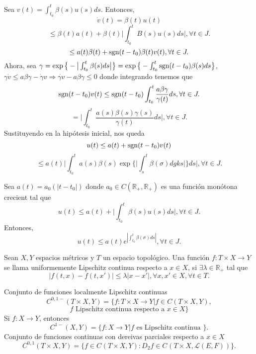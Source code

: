 \begin{dem}
  Sea $v(t) = \int_{t_{0}}^{t} \beta(s) u(s) ds$. Entonces,
  \[ 
    \dot{v}(t) = \beta(t) u(t) 
  \] 
  \[ 
    \leq \beta(t) a(t) + \beta(t) \Big | \int_{t_{0}}^{t} B(s) u(s)  ds \Big |, \forall t \in J.
  \] 
  \[ 
    \leq a(t) \beta(t) + \operatorname{sgn}(t - t_{0}) \beta(t) v(t), \forall t \in J.
  \] 
  Ahora, sea $\gamma = \exp \big\{ - \big | \int_{t_{0}}^{t} \beta(s) ds \big | \big\} = \exp \big\{ - \int_{t_{0}}^{t} \operatorname{sgn} (t - t_{0}) \beta(s) ds \big\} $,
  $\gamma \dot{v} \leq a \beta \gamma - \dot{\gamma} v \Rightarrow \dot{\gamma v} - a \beta \gamma \leq 0$ donde integrando tenemos que
  \[ 
    \operatorname{sgn}(t-t_{0}) v(t) \leq \operatorname{sgn}(t -t_{0}) \int_{t_{0}}^{t} \frac{a \beta \gamma }{\gamma(t)} ds , \forall t \in J.
  \] 
  \[ 
    = \Big | \int_{t_{0}}^{t} \frac{a(s) \beta(s) \gamma(s)}{\gamma(t)} ds \Big |, \forall t \in J. 
  \] 
  Sustituyendo en la hipótesis inicial, nos queda
  \[ 
     u(t) \leq a(t) + \operatorname{sgn}(t -t_{0})v(t)
  \] 
  \[ 
    \leq a(t) \Big | \int_{t_{0}}^{t} a(s) \beta(s) \exp \Big\{ \Big | \int_{s}^{t} \beta(\sigma) dgks \Big | \Big\} ds \Big |, \forall t \in J.
  \] 
\end{dem}

\begin{cor}
  Sea $a(t) = a_{0}(| t -  t_{0} |)$ donde $a_{0} \in C(\mathbb{R}_{+}, \mathbb{R}_{+})$ es una función monótona crecient tal que
  \[ 
    u(t) \leq a(t) + \Big | \int_{t_{0}}^{t} \beta(s) u(s) ds \Big |, \forall t \in J. 
  \]
  Entonces, 
  \[ 
    u(t) \leq a(t) e^{| \int_{t_{0}}^{t} \beta(\sigma) ds |}, \forall t \in J. 
  \] 
\end{cor}

\begin{defn}
  Sean $X, Y$ espacios métricos y $T$ un espacio topológico. Una función $f: T \times X \to Y$ se llama uniformemente Lipschitz continua respecto a $x \in X$, si $\exists \lambda \in \mathbb{R}_{+}$ tal que 
  \[ 
    | f(t,x) - f(t,x') | \leq \lambda | x - x' |, \forall x,x' \in X, \forall t \in T. 
  \] 
\end{defn}

\begin{nota}
  Conjunto de funciones localmente Lipschitz continuas
  \[ 
    C^{0,1-}(T \times X, Y) = \{ f: T \times X \to Y | f \in C(T \times X, Y),
  \] 
  \[ 
     f \text{ Lipschitz continua respecto a } x \in X \}  
  \] 
  Si $f: X \to Y$, entonces
  \[ 
    C^{1-}(X,Y) = \{ f: X \to Y | f \text{ es Lipschitz continua } \} .
  \]
  Conjunto de funciones continuas con dereivas parciales respecto a $x \in X$
  \[ 
    C^{0,1}(T \times X, Y) = \{ f \in C^{}(T \times X, Y) : D_{2}f \in C^{}(T \times X, \mathcal{L}(E,F)) \}.
  \] 
\end{nota}

